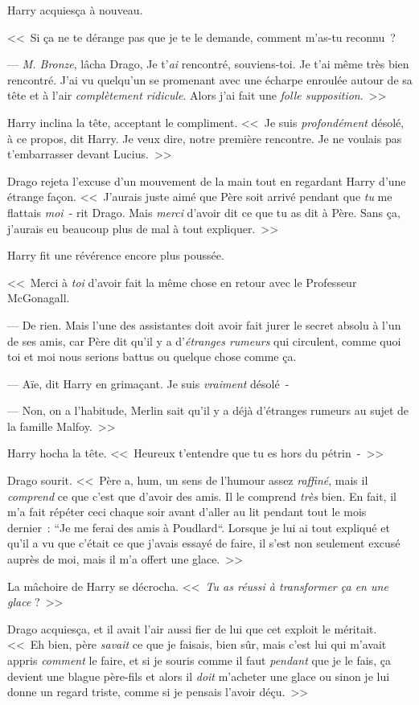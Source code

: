 Harry acquiesça à nouveau.

<<~Si ça ne te dérange pas que je te le demande, comment m'as-tu reconnu~?

--- \emph{M. Bronze}, lâcha Drago, Je t'\emph{ai} rencontré, souviens-toi. Je t'ai même très bien rencontré. J'ai vu quelqu'un se promenant avec une écharpe enroulée autour de sa tête et à l'air \emph{complètement ridicule}. Alors j'ai fait une \emph{folle supposition}.~>>

Harry inclina la tête, acceptant le compliment. <<~Je suis \emph{profondément} désolé, à ce propos, dit Harry. Je veux dire, notre première rencontre. Je ne voulais pas t'embarrasser devant Lucius.~>>

Drago rejeta l'excuse d'un mouvement de la main tout en regardant Harry d'une étrange façon. <<~J'aurais juste aimé que Père soit arrivé pendant que \emph{tu} me flattais \emph{moi}~- rit Drago. Mais \emph{merci} d'avoir dit ce que tu as dit à Père. Sans ça, j'aurais eu beaucoup plus de mal à tout expliquer.~>>

Harry fit une révérence encore plus poussée.

<<~Merci à \emph{toi} d'avoir fait la même chose en retour avec le Professeur McGonagall.

--- De rien. Mais l'une des assistantes doit avoir fait jurer le secret absolu à l'un de ses amis, car Père dit qu'il y a d'\emph{étranges rumeurs} qui circulent, comme quoi toi et moi nous serions battus ou quelque chose comme ça.

--- Aïe, dit Harry en grimaçant. Je suis \emph{vraiment} désolé~-

--- Non, on a l'habitude, Merlin sait qu'il y a déjà d'étranges rumeurs au sujet de la famille Malfoy.~>>

Harry hocha la tête. <<~Heureux t'entendre que tu es hors du pétrin~-~>>

Drago sourit. <<~Père a, hum, un sens de l'humour assez \emph{raffiné}, mais il \emph{comprend} ce que c'est que d'avoir des amis. Il le comprend \emph{très} bien. En fait, il m'a fait répéter ceci chaque soir avant d'aller au lit pendant tout le mois dernier~: “Je me ferai des amis à Poudlard“. Lorsque je lui ai tout expliqué et qu'il a vu que c'était ce que j'avais essayé de faire, il s'est non seulement excusé auprès de moi, mais il m'a offert une glace.~>>

La mâchoire de Harry se décrocha. <<~\emph{Tu as réussi à transformer ça en une glace} ?~>>

Drago acquiesça, et il avait l'air aussi fier de lui que cet exploit le méritait. <<~Eh bien, père \emph{savait} ce que je faisais, bien sûr, mais c'est lui qui m'avait appris \emph{comment} le faire, et si je souris comme il faut \emph{pendant} que je le fais, ça devient une blague père-fils et alors il \emph{doit} m'acheter une glace ou sinon je lui donne un regard triste, comme si je pensais l'avoir déçu.~>>

